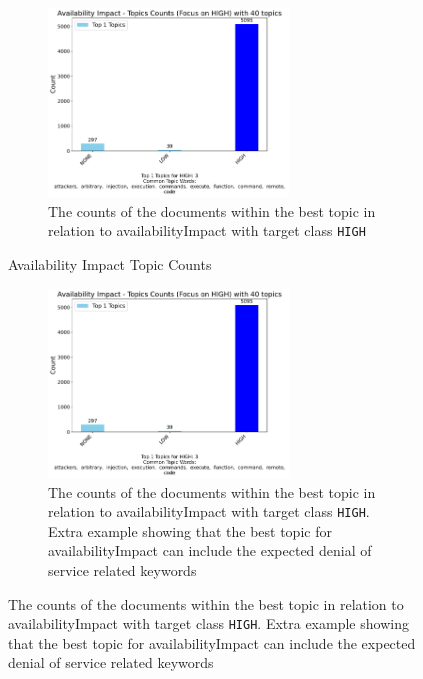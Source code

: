 \documentclass[12pt]{article}
\begin{document}
\begin{figure}[h!]
	\ContinuedFloat
	\centering
	\begin{subfigure}{\textwidth}
		\centering
		\includegraphics[width=0.7\textwidth]{figures/availabilityImpact/merged_top_k_topics_category_focus_counts_availabilityImpact_HIGH_k1.pdf}
		\caption{The counts of the documents within the best topic in relation to availabilityImpact with target class \texttt{HIGH}}
		\label{fig:availabilityImpact_60_HIGH}
	\end{subfigure}

	\caption{Availability Impact Topic Counts}
\end{figure}

\begin{figure}[h!]
	\ContinuedFloat
	\begin{subfigure}{\textwidth}
		\centering
		\includegraphics[width=0.7\textwidth]{figures/availabilityImpact/merged_top_k_topics_category_focus_counts_availabilityImpact_HIGH_k1.pdf}
		\caption{The counts of the documents within the best topic in relation to availabilityImpact
			with target class \texttt{HIGH}. Extra example showing that the best topic for
			availabilityImpact can include the expected denial of service related keywords}
		\label{fig:availabilityImpact_60_HIGH_denial}
	\end{subfigure}

\end{figure}
\end{document}
